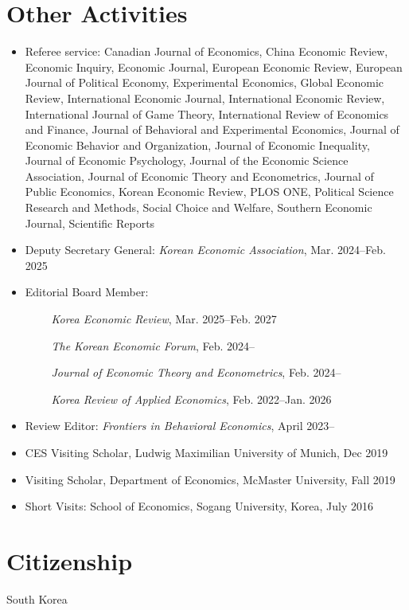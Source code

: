 \documentclass[margin, a4paper]{res}
\begin{document}
\begin{resume}
\section{Other Activities}
\begin{itemize}[leftmargin=*]
\item Referee service: Canadian Journal of Economics, China Economic Review, Economic Inquiry, Economic Journal, European Economic Review, European Journal of Political Economy, Experimental Economics, Global Economic Review, International Economic Journal, International Economic Review, International Journal of Game Theory, International Review of Economics and Finance, Journal of Behavioral and Experimental Economics, Journal of Economic Behavior and Organization, Journal of Economic Inequality, Journal of Economic Psychology, Journal of the Economic Science Association, Journal of Economic Theory and Econometrics, Journal of Public Economics, Korean Economic Review, PLOS ONE, Political Science Research and Methods, Social Choice and Welfare, Southern Economic Journal, Scientific Reports
\item Deputy Secretary General: \emph{Korean Economic Association}, Mar. 2024--Feb. 2025
\item Editorial Board Member: 

$\qquad$ \emph{Korea Economic Review}, Mar. 2025--Feb. 2027

$\qquad$ \emph{The Korean Economic Forum}, Feb. 2024--

$\qquad$ \emph{Journal of Economic Theory and Econometrics}, Feb. 2024--

$\qquad$ \emph{Korea Review of Applied Economics}, Feb. 2022--Jan. 2026

\item Review Editor: \emph{Frontiers in Behavioral Economics}, April 2023--
\item CES Visiting Scholar, Ludwig Maximilian University of Munich, Dec 2019
\item Visiting Scholar, Department of Economics, McMaster University, Fall 2019
\item Short Visits: School of Economics, Sogang University, Korea, July 2016
\end{itemize}

\section{Citizenship} South Korea %


\end{resume}
\end{document}

